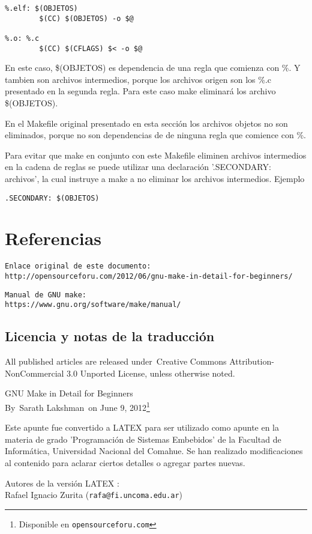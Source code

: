 \documentclass[output=paper, 
colorlinks,
citecolor=brown,
newtxmath
]{langscibook}
\begin{document}
\begin{verbatim}
%.elf: $(OBJETOS)
        $(CC) $(OBJETOS) -o $@

%.o: %.c
        $(CC) $(CFLAGS) $< -o $@
\end{verbatim}

En este caso, \$(OBJETOS) es dependencia de una regla que comienza con \%.
Y tambien son archivos intermedios, porque los archivos origen son los 
\%.c presentado en la segunda regla. Para este caso make eliminará
los archivo \$(OBJETOS).

En el Makefile original presentado en esta sección los archivos objetos
no son eliminados, porque no son dependencias de de ninguna regla que comience con \%.

Para evitar que make en conjunto con este Makefile eliminen archivos
intermedios en la cadena de reglas
se puede utilizar una declaración '.SECONDARY: archivos', la cual instruye a make a no eliminar los archivos intermedios. Ejemplo

\begin{verbatim}
.SECONDARY: $(OBJETOS)
\end{verbatim}

\section {Referencias}

\begin{verbatim}
Enlace original de este documento:
http://opensourceforu.com/2012/06/gnu-make-in-detail-for-beginners/
\end{verbatim}

\begin{verbatim}
Manual de GNU make:
https://www.gnu.org/software/make/manual/
\end{verbatim}

\subsection {Licencia y notas de la traducción}

All published articles are released under Creative Commons 
Attribution-NonCommercial 3.0 Unported License, unless otherwise noted.

GNU Make in Detail for Beginners \\
By Sarath Lakshman on June 9, 2012\footnote{Disponible en 
\texttt{opensourceforu.com}}

Este apunte fue convertido a LATEX para 
ser utilizado como apunte en la materia de grado
'Programación de Sistemas Embebidos' de la Facultad de Informática,
Universidad Nacional del Comahue.
Se han realizado modificaciones
al contenido para aclarar ciertos detalles o agregar partes nuevas.

Autores de la versión LATEX : \\
Rafael Ignacio Zurita (\texttt{rafa@fi.uncoma.edu.ar}) \\
\end{document}
